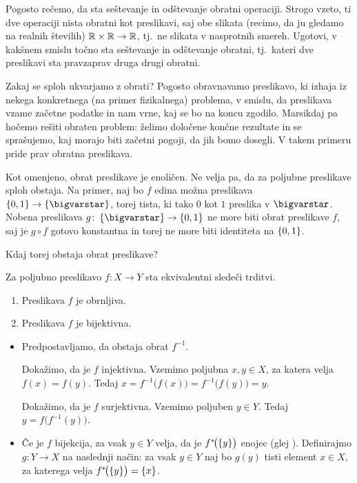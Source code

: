 		\begin{vaja}
			Pogosto rečemo, da sta seštevanje in odštevanje obratni operaciji. Strogo vzeto, ti dve operaciji nista obratni kot preslikavi, saj obe slikata (recimo, da ju gledamo na realnih številih) $\mathbb{R} \times \mathbb{R} \to \mathbb{R}$, tj.~ne slikata v nasprotnih smereh. Ugotovi, v kakšnem smislu točno sta seštevanje in odštevanje obratni, tj.~kateri dve preslikavi sta pravzaprav druga drugi obratni.
		\end{vaja}
		
		Zakaj se sploh ukvarjamo z obrati? Pogosto obravnavamo preslikavo, ki izhaja iz nekega konkretnega (na primer fizikalnega) problema, v smislu, da preslikava vzame začetne podatke in nam vrne, kaj se bo na koncu zgodilo. Marsikdaj pa hočemo rešiti obraten problem: želimo določene končne rezultate in se sprašujemo, kaj morajo biti začetni pogoji, da jih bomo dosegli. V takem primeru pride prav obratna preslikava.
		
		Kot omenjeno, obrat preslikave je enoličen. Ne velja pa, da za poljubne preslikave sploh obstaja. Na primer, naj bo $f$ edina možna preslikava $\set{0, 1} \to \set{\unit}$, torej tista, ki tako $0$ kot $1$ preslika v $\unit$. Nobena preslikava $g\colon \set{\unit} \to \set{0, 1}$ ne more biti obrat preslikave $f$, saj je $g \circ f$ gotovo konstantna in torej ne more biti identiteta na $\set{0, 1}$.
		
		Kdaj torej obstaja obrat preslikave?
		
		\begin{trditev}
			Za poljubno preslikavo $f\colon X \to Y$ sta ekvivalentni sledeči trditvi.
			\begin{enumerate}
				\item
					Preslikava $f$ je obrnljiva.
				\item
					Preslikava $f$ je bijektivna.
			\end{enumerate}
		\end{trditev}
		
		\begin{dokaz}
			\begin{itemize}
				\item{}
					Predpostavljamo, da obstaja obrat $f^{-1}$.
					
					Dokažimo, da je $f$ injektivna. Vzemimo poljubna $x, y \in X$, za katera velja $f(x) = f(y)$. Tedaj $x = f^{-1}\big(f(x)\big) = f^{-1}\big(f(y)\big) = y$.
					
					Dokažimo, da je $f$ surjektivna. Vzemimo poljuben $y \in Y$. Tedaj $y = f\big(f^{-1}(y)\big)$.
				\item{}
					Če je $f$ bijekcija, za vsak $y \in Y$ velja, da je $\pim[1]{f}{\set{y}}$ enojec (glej ). Definirajmo $g\colon Y \to X$ na naslednji način: za vsak $y \in Y$ naj bo $g(y)$ tisti element $x \in X$, za katerega velja $\pim[1]{f}{\set{y}} = \set{x}$. 
			\end{itemize}
		\end{dokaz}
		
